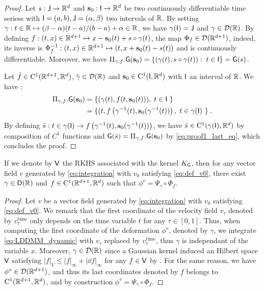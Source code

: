 \begin{proof}
  Let $s:  \mathsf{J} \to \mathbb{R}^d  $ and $\mathbf{s}_0: \mathsf{I}\to \mathbb{R}^d $ be two continuously differentiable time seriess with $\mathsf{I}=(a,b),\mathsf{J}=(\alpha,\beta)$ two intervals of $\mathbb{R}$.
  By setting $\gamma: t\in \mathbb{R} \mapsto (\beta-\alpha)(t-a)/(b-a)+\alpha\in \mathbb{R} $, we have $ \gamma(\mathsf{I})=\mathsf{J}$ and $\gamma \in \mathcal{D}(\mathbb{R}) $.
   By defining $f:(t,x)\in\mathbb{R}^{d+1}\mapsto x-\mathbf{s}_0(t)+s\circ \gamma(t) $, the map $\Phi_f\in \mathcal{D}(\mathbb{R}^{d+1})$,
    indeed, its inverse is $\Phi_f^{-1}:(t,x)\in\mathbb{R}^{d+1}\mapsto (t,x+\mathbf{s}_0(t)-s(t)) $ and is continuously differentiable.
     Moreover, we have $\Pi_{\gamma,f}.\mathsf{G}(\mathbf{s}_0)=\{(\gamma(t),s\circ \gamma(t)):\; t\in\mathsf{I} \}=\mathsf{G}(s) $.

    

    Let $\bar{f}\in \mathrm{C}^1(\mathbb{R}^{d+1},\mathbb{R}^d)$, $\bar{\gamma}\in  \mathcal{D}(\mathbb{R}) $ and $\mathbf{s}_0\in \mathrm{C}^1(\mathsf{I},\mathbb{R}^d)$ with $\mathsf{I}$ an interval of $\mathbb{R}$.
    We have :
    \begin{align}
      \Pi_{\gamma,f}.\msg(\mathbf{s}_0)&=\{(\gamma(t),f(t,\mathbf{s}_0(t))),\eqsp t\in \msi \} \\
      &\label{eq:proof1_last_eq}=\{(t,f\left(\gamma^{-1}(t),\mathbf{s}_0(\gamma^{-1}(t))\right),\eqsp t\in \gamma(\msi) \} \eqsp .
    \end{align}
    By defining $\bar{s}:t\in \gamma(\mathsf{I})\to f\left(\gamma^{-1}(t),\mathbf{s}_0(\gamma^{-1}(t))\right) $, we have $\bar{s}\in \mathrm{C}^1(\gamma(\mathsf{I}), \mathbb{R}^d) $ by composition of $C^1$ functions
    and $ \mathsf{G}(\bar{s})= \Pi_{\gamma,f}.\mathsf{G}(\mathbf{s}_0)$ by \eqref{eq:proof1_last_eq}, which concludes the proof.
\end{proof}
\begin{lemma}
  If we denote by $\mathsf{V}$ the RKHS associated with the kernel $K_{\mathsf{G}}$, then for any vector field $v$ generated by \eqref{eq:integration} with $v_0$ satisfying \eqref{eq:def_v0},
   there exist $\gamma \in \mathsf{D}(\mathbb{R}) $ and $f\in \mathrm{C}^1(\mathbb{R}^{d+1},\mathbb{R}^d)$ such that $\phi^v=\Psi_\gamma\circ\Phi_f $.
\end{lemma}
\begin{proof}
  Let $v$ be a vector field generated by \eqref{eq:integration} with $v_0$ satisfying \eqref{eq:def_v0}.
 We remark that the first coordinate of the velocity field $v_\tau$ denoted by $v_\tau^{\text{time}}$ only depends on the time variable $t$ for any $\tau\in[0,1]$.
 Thus, when computing the first coordinate of the deformation $\phi^v$, denoted by $\gamma$, we integrate \eqref{eq:LDDMM_dynamic} with $v_\tau$ replaced by $v_\tau^{\text{time}}$,
  thus $\gamma$ is independant of the variable $x$. Moreover, $\gamma\in \mathcal{D}(\mathbb{R})$ since a Gaussian kernel induced an Hilbert space $\mathsf{V}$ satisfying $|f|_V\leq |f|_\infty+ |\dd f|_\infty  $ for any $f\in \mathsf{V}$ by \citep[Theorem 9]{glaunes2005transport}.
  For the same reason, we have $\phi^v\in \mathcal{D}(\mathbb{R}^{d+1})$, and thus its last coordinates denoted by $f$ belongs to $\mathrm{C}^1(\mathbb{R}^{d+1},\mathbb{R}^d)$, and by construction $\phi^v=\Psi_\gamma\circ\Phi_f $.
\end{proof}





